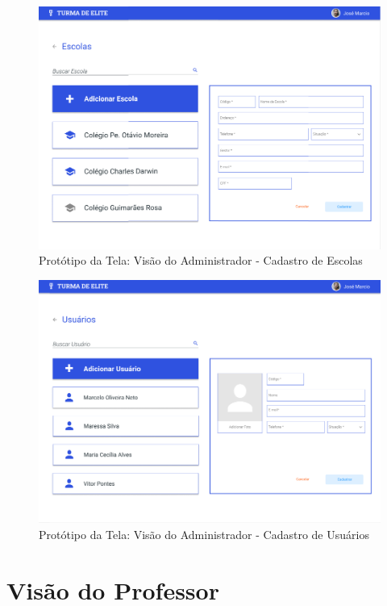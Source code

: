 \begin{apendicesenv}
\begin{figure}[htb]
    \centering
	\includegraphics[width=16cm]{imagens/Administrador-CadastroEscola.png}
	\caption{\label{fig:cadastro-escola} Protótipo da Tela: Visão do Administrador - Cadastro de Escolas}
\end{figure}
\FloatBarrier

\begin{figure}[htb]
    \centering
	\includegraphics[width=16cm]{imagens/Administrador-CadastroUsuario.png}
	\caption{\label{fig:cadastro-usuário} Protótipo da Tela: Visão do Administrador - Cadastro de Usuários}
\end{figure}
\FloatBarrier


\section{Visão do Professor}


\end{apendicesenv}
